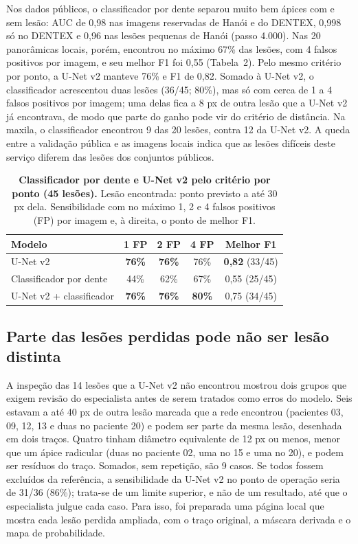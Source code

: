 \documentclass[twocolumn]{article}
\begin{document}
Nos dados públicos, o classificador por dente separou muito bem ápices com e sem lesão: AUC de 0,98 nas imagens reservadas de Hanói e do DENTEX, 0,998 só no DENTEX e 0,96 nas lesões pequenas de Hanói (passo 4.000). Nas 20 panorâmicas locais, porém, encontrou no máximo 67\% das lesões, com 4 falsos positivos por imagem, e seu melhor F1 foi 0,55 (Tabela~2). Pelo mesmo critério por ponto, a U-Net v2 manteve 76\% e F1 de 0,82. Somado à U-Net v2, o classificador acrescentou duas lesões (36/45; 80\%), mas só com cerca de 1 a 4 falsos positivos por imagem; uma delas fica a 8 px de outra lesão que a U-Net v2 já encontrava, de modo que parte do ganho pode vir do critério de distância. Na maxila, o classificador encontrou 9 das 20 lesões, contra 12 da U-Net v2. A queda entre a validação pública e as imagens locais indica que as lesões difíceis deste serviço diferem das lesões dos conjuntos públicos.

\begin{table}[!t]
\caption{\textbf{Classificador por dente e U-Net v2 pelo critério por ponto (45 lesões).} Lesão encontrada: ponto previsto a até 30 px dela. Sensibilidade com no máximo 1, 2 e 4 falsos positivos (FP) por imagem e, à direita, o ponto de melhor F1.}
\centering\tablefont
\begin{tabularx}{\columnwidth}{L c c c c}
\toprule
Modelo & 1 FP & 2 FP & 4 FP & Melhor F1 \\
\midrule
U-Net v2 & \textbf{76\%} & \textbf{76\%} & 76\% & \textbf{0,82} (33/45) \\
Classificador por dente & 44\% & 62\% & 67\% & 0,55 (25/45) \\
U-Net v2 + classificador & \textbf{76\%} & \textbf{76\%} & \textbf{80\%} & 0,75 (34/45) \\
\bottomrule
\end{tabularx}
\end{table}

\subsection{Parte das lesões perdidas pode não ser lesão distinta}

A inspeção das 14 lesões que a U-Net v2 não encontrou mostrou dois grupos que exigem revisão do especialista antes de serem tratados como erros do modelo. Seis estavam a até 40 px de outra lesão marcada que a rede encontrou (pacientes 03, 09, 12, 13 e duas no paciente 20) e podem ser parte da mesma lesão, desenhada em dois traços. Quatro tinham diâmetro equivalente de 12 px ou menos, menor que um ápice radicular (duas no paciente 02, uma no 15 e uma no 20), e podem ser resíduos do traço. Somados, sem repetição, são 9 casos. Se todos fossem excluídos da referência, a sensibilidade da U-Net v2 no ponto de operação seria de 31/36 (86\%); trata-se de um limite superior, e não de um resultado, até que o especialista julgue cada caso. Para isso, foi preparada uma página local que mostra cada lesão perdida ampliada, com o traço original, a máscara derivada e o mapa de probabilidade.
\end{document}
